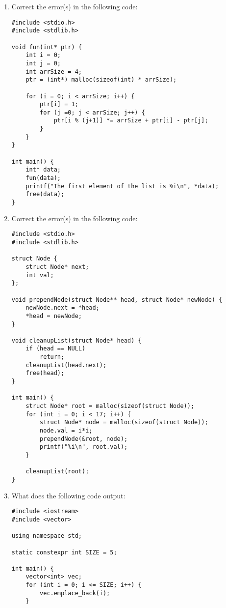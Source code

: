 \documentclass[12pt,letterpaper]{article}
\begin{document}
\begin{enumerate}
    \item Correct the error(s) in the following code:
    
    \begin{lstlisting}
#include <stdio.h>
#include <stdlib.h>

void fun(int* ptr) {
    int i = 0;
    int j = 0;
    int arrSize = 4;
    ptr = (int*) malloc(sizeof(int) * arrSize);
    
    for (i = 0; i < arrSize; i++) {
        ptr[i] = 1;
        for (j =0; j < arrSize; j++) {
            ptr[i % (j+1)] *= arrSize + ptr[i] - ptr[j];
        }
    }
}

int main() {
    int* data;
    fun(data);
    printf("The first element of the list is %i\n", *data);
    free(data);
}

    \end{lstlisting}
    
    \item Correct the error(s) in the following code:
    \begin{lstlisting}
#include <stdio.h>
#include <stdlib.h>

struct Node {
    struct Node* next;
    int val;
};

void prependNode(struct Node** head, struct Node* newNode) {
    newNode.next = *head;
    *head = newNode;
}

void cleanupList(struct Node* head) {
    if (head == NULL)
        return;
    cleanupList(head.next);
    free(head);
}

int main() {
    struct Node* root = malloc(sizeof(struct Node));
    for (int i = 0; i < 17; i++) {
        struct Node* node = malloc(sizeof(struct Node));
        node.val = i*i;
        prependNode(&root, node);
        printf("%i\n", root.val);
    }

    cleanupList(root);
}
    \end{lstlisting}
    
    \item What does the following code output:
    
    \begin{lstlisting}
#include <iostream>
#include <vector>

using namespace std;

static constexpr int SIZE = 5;

int main() {
    vector<int> vec;
    for (int i = 0; i <= SIZE; i++) {
        vec.emplace_back(i);
    }


\end{lstlisting}
\end{enumerate}
\end{document}
